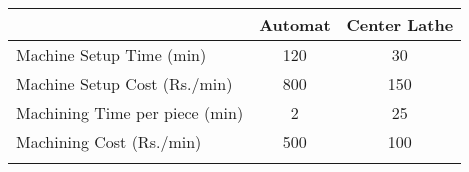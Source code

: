 \begin{center}
\begin{tabular}{lcc}
 & {Automat} & {Center Lathe} \\
\hline
Machine Setup Time (min) & 120 & 30 \\ \hline
Machine Setup Cost (Rs./min) & 800 & 150 \\ \hline
Machining Time per piece (min) & 2 & 25 \\ \hline
Machining Cost (Rs./min) & 500 & 100 \\ \hline \\
\end{tabular}
\end{center}